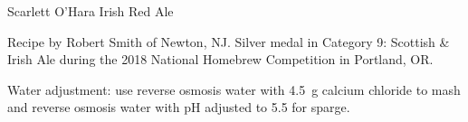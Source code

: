 \begin{recipe}{Scarlett O'Hara Irish Red Ale}

\begin{aboutblock}
Recipe by Robert Smith of Newton, NJ. Silver medal in Category 9: Scottish \&
Irish Ale during the 2018 National Homebrew Competition in Portland, OR.
\sourceaha
\end{aboutblock}


\begin{methodandtiming}
 
\begin{mashsteps}
\end{mashsteps}

\begin{fermentationsteps}
\end{fermentationsteps}

\begin{directions}
Water adjustment: use  reverse osmosis water with 4.5~g calcium chloride
to mash and  reverse osmosis water with pH adjusted to 5.5 for sparge.
\end{directions}

\end{methodandtiming}

\recipebreak

\begin{ingredientsblock}

\begin{malts}
\end{malts}

\begin{hops}
\end{hops}


\end{ingredientsblock}

\end{recipe}


